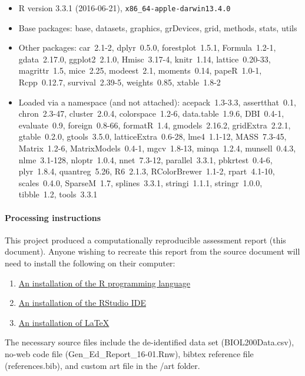 \documentclass[fleqn,10pt]{SelfArx}\usepackage[]{graphicx}\usepackage[]{color}
\begin{document}
\begin{itemize}\raggedright
  \item R version 3.3.1 (2016-06-21), \verb|x86_64-apple-darwin13.4.0|
  \item Base packages: base, datasets, graphics, grDevices, grid,
    methods, stats, utils
  \item Other packages: car~2.1-2, dplyr~0.5.0, forestplot~1.5.1,
    Formula~1.2-1, gdata~2.17.0, ggplot2~2.1.0, Hmisc~3.17-4,
    knitr~1.14, lattice~0.20-33, magrittr~1.5, mice~2.25,
    modeest~2.1, moments~0.14, papeR~1.0-1, Rcpp~0.12.7,
    survival~2.39-5, weights~0.85, xtable~1.8-2
  \item Loaded via a namespace (and not attached):
    acepack~1.3-3.3, assertthat~0.1, chron~2.3-47, cluster~2.0.4,
    colorspace~1.2-6, data.table~1.9.6, DBI~0.4-1, evaluate~0.9,
    foreign~0.8-66, formatR~1.4, gmodels~2.16.2, gridExtra~2.2.1,
    gtable~0.2.0, gtools~3.5.0, latticeExtra~0.6-28, lme4~1.1-12,
    MASS~7.3-45, Matrix~1.2-6, MatrixModels~0.4-1, mgcv~1.8-13,
    minqa~1.2.4, munsell~0.4.3, nlme~3.1-128, nloptr~1.0.4,
    nnet~7.3-12, parallel~3.3.1, pbkrtest~0.4-6, plyr~1.8.4,
    quantreg~5.26, R6~2.1.3, RColorBrewer~1.1-2, rpart~4.1-10,
    scales~0.4.0, SparseM~1.7, splines~3.3.1, stringi~1.1.1,
    stringr~1.0.0, tibble~1.2, tools~3.3.1
\end{itemize}


\paragraph{Processing instructions}
This project produced a computationally reproducible assessment report (this document). Anyone wishing to recreate this report from the source document will need to install the following on their computer:
\begin{enumerate}
\item \href{https://www.r-project.org}{An installation of the R programming language}
\item \href{https://www.rstudio.com/products/rstudio/download3/}{ An installation of the RStudio IDE}
\item \href{https://www.latex-project.org/get/}{An installation of \LaTeX}
\end{enumerate}

The necessary source files include the de-identified data set (BIOL200Data.csv), no-web code file (Gen\_Ed\_Report\_16-01.Rnw), bibtex reference file (references.bib), and custom art file in the /art folder.
\end{document}
